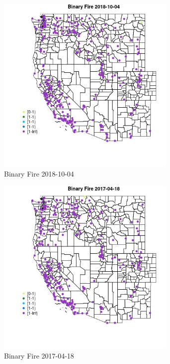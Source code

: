 \begin{figure} 
\centering  
\includegraphics[width=0.77\textwidth]{Code_Outputs/Report_ML_input_PM25_Step4_part_f_de_duplicated_aves_prioritize_24hr_obswNAs_MapObsBinary_Fire2018-10-04.jpg} 
\caption{\label{fig:Report_ML_input_PM25_Step4_part_f_de_duplicated_aves_prioritize_24hr_obswNAsMapObsBinary_Fire2018-10-04}Binary Fire 2018-10-04} 
\end{figure} 
 

\begin{figure} 
\centering  
\includegraphics[width=0.77\textwidth]{Code_Outputs/Report_ML_input_PM25_Step4_part_f_de_duplicated_aves_prioritize_24hr_obswNAs_MapObsBinary_Fire2017-04-18.jpg} 
\caption{\label{fig:Report_ML_input_PM25_Step4_part_f_de_duplicated_aves_prioritize_24hr_obswNAsMapObsBinary_Fire2017-04-18}Binary Fire 2017-04-18} 
\end{figure} 
 

